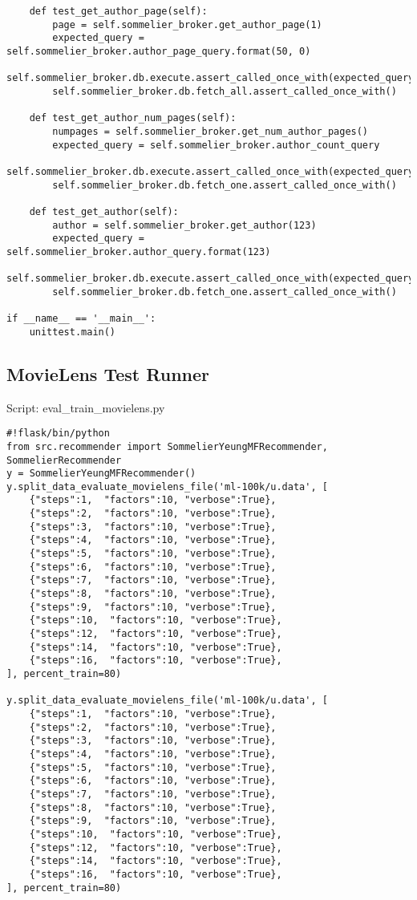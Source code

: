 \begin{verbatim}
    def test_get_author_page(self):
        page = self.sommelier_broker.get_author_page(1)
        expected_query = self.sommelier_broker.author_page_query.format(50, 0)
        self.sommelier_broker.db.execute.assert_called_once_with(expected_query)
        self.sommelier_broker.db.fetch_all.assert_called_once_with()
    
    def test_get_author_num_pages(self):
        numpages = self.sommelier_broker.get_num_author_pages()
        expected_query = self.sommelier_broker.author_count_query
        self.sommelier_broker.db.execute.assert_called_once_with(expected_query)
        self.sommelier_broker.db.fetch_one.assert_called_once_with()
    
    def test_get_author(self):
        author = self.sommelier_broker.get_author(123)
        expected_query = self.sommelier_broker.author_query.format(123)
        self.sommelier_broker.db.execute.assert_called_once_with(expected_query)
        self.sommelier_broker.db.fetch_one.assert_called_once_with()

if __name__ == '__main__':
    unittest.main()

\end{verbatim}

\subsection{MovieLens Test Runner}

Script: eval\_train\_movielens.py

\begin{verbatim}
#!flask/bin/python
from src.recommender import SommelierYeungMFRecommender, SommelierRecommender
y = SommelierYeungMFRecommender()
y.split_data_evaluate_movielens_file('ml-100k/u.data', [
    {"steps":1,  "factors":10, "verbose":True},
    {"steps":2,  "factors":10, "verbose":True},
    {"steps":3,  "factors":10, "verbose":True},
    {"steps":4,  "factors":10, "verbose":True},
    {"steps":5,  "factors":10, "verbose":True},
    {"steps":6,  "factors":10, "verbose":True},
    {"steps":7,  "factors":10, "verbose":True},
    {"steps":8,  "factors":10, "verbose":True},
    {"steps":9,  "factors":10, "verbose":True},
    {"steps":10,  "factors":10, "verbose":True},
    {"steps":12,  "factors":10, "verbose":True},
    {"steps":14,  "factors":10, "verbose":True},
    {"steps":16,  "factors":10, "verbose":True},
], percent_train=80)

y.split_data_evaluate_movielens_file('ml-100k/u.data', [
    {"steps":1,  "factors":10, "verbose":True},
    {"steps":2,  "factors":10, "verbose":True},
    {"steps":3,  "factors":10, "verbose":True},
    {"steps":4,  "factors":10, "verbose":True},
    {"steps":5,  "factors":10, "verbose":True},
    {"steps":6,  "factors":10, "verbose":True},
    {"steps":7,  "factors":10, "verbose":True},
    {"steps":8,  "factors":10, "verbose":True},
    {"steps":9,  "factors":10, "verbose":True},
    {"steps":10,  "factors":10, "verbose":True},
    {"steps":12,  "factors":10, "verbose":True},
    {"steps":14,  "factors":10, "verbose":True},
    {"steps":16,  "factors":10, "verbose":True},
], percent_train=80)
\end{verbatim}
\normalsize
